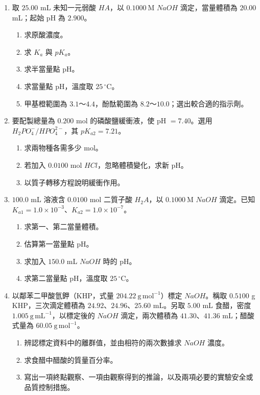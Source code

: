 \documentclass[11pt,a4paper]{article}
\providecommand{\tightlist}{%
  \setlength{\itemsep}{0pt}\setlength{\parskip}{0pt}}
\begin{document}
\begin{enumerate}
\def\labelenumi{\arabic{enumi}.}
\setcounter{enumi}{12}
\tightlist
\item
  取 \(25.00\) mL 未知一元弱酸 \(HA\)，以 \(0.1000\ \mathrm M\) \(NaOH\) 滴定，當量體積為 \(20.00\) mL；起始 pH 為 \(2.900\)。

  \begin{enumerate}
  \def\labelenumii{\arabic{enumii}.}
  \tightlist
  \item
    求原酸濃度。
  \item
    求 \(K_a\) 與 \(pK_a\)。
  \item
    求半當量點 pH。
  \item
    求當量點 pH，溫度取 \(25\,^\circ\mathrm C\)。
  \item
    甲基橙範圍為 \(3.1\)～\(4.4\)，酚酞範圍為 \(8.2\)～\(10.0\)；選出較合適的指示劑。
  \end{enumerate}
\item
  要配製總量為 \(0.200\) mol 的磷酸鹽緩衝液，使 pH \(=7.40\)。選用 \(H_2PO_4^-/HPO_4^{2-}\)，其 \(pK_{a2}=7.21\)。

  \begin{enumerate}
  \def\labelenumii{\arabic{enumii}.}
  \tightlist
  \item
    求兩物種各需多少 mol。
  \item
    若加入 \(0.0100\) mol \(HCl\)，忽略體積變化，求新 pH。
  \item
    以質子轉移方程說明緩衝作用。
  \end{enumerate}
\item
  \(100.0\) mL 溶液含 \(0.0100\) mol 二質子酸 \(H_2A\)，以 \(0.1000\ \mathrm M\) \(NaOH\) 滴定。已知 \(K_{a1}=1.0\times10^{-3}\)、\(K_{a2}=1.0\times10^{-7}\)。

  \begin{enumerate}
  \def\labelenumii{\arabic{enumii}.}
  \tightlist
  \item
    求第一、第二當量體積。
  \item
    估算第一當量點 pH。
  \item
    求加入 \(150.0\) mL \(NaOH\) 時的 pH。
  \item
    求第二當量點 pH，溫度取 \(25\,^\circ\mathrm C\)。
  \end{enumerate}
\item
  以鄰苯二甲酸氫鉀（KHP，式量 \(204.22\ \mathrm{g\,mol^{-1}}\)）標定 \(NaOH\)。稱取 \(0.5100\) g KHP，三次滴定體積為 \(24.92\)、\(24.96\)、\(25.60\) mL。另取 \(5.00\) mL 食醋，密度 \(1.005\ \mathrm{g\,mL^{-1}}\)，以標定後的 \(NaOH\) 滴定，兩次體積為 \(41.30\)、\(41.36\) mL；醋酸式量為 \(60.05\ \mathrm{g\,mol^{-1}}\)。

  \begin{enumerate}
  \def\labelenumii{\arabic{enumii}.}
  \tightlist
  \item
    辨認標定資料中的離群值，並由相符的兩次數據求 \(NaOH\) 濃度。
  \item
    求食醋中醋酸的質量百分率。
  \item
    寫出一項終點觀察、一項由觀察得到的推論，以及兩項必要的實驗安全或品質控制措施。
  \end{enumerate}
\end{enumerate}
\end{document}
